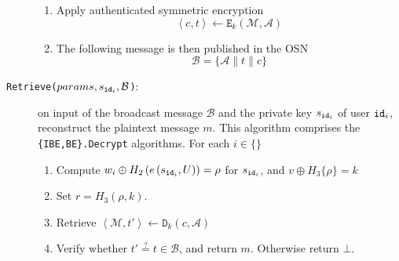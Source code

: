 \begin{algorithm}[H]
\begin{description}
\begin{enumerate}
        \item Apply authenticated symmetric encryption
        \begin{equation*}
            \left< c, t \right> \leftarrow \mathtt{E}_k(\mathcal{M},\mathcal{A})
        \end{equation*}
        \item The following message is then published in the OSN
        \begin{equation*}
            \mathcal{B} = \{ \mathcal{A} \parallel t \parallel c \}
        \end{equation*}
    \end{enumerate}
    \item[\texttt{Retrieve($params, s_{\mathtt{id}_{i}}, \mathcal{B}$)}:] on input of the broadcast message $\mathcal{B}$ and the private key $s_{\mathtt{id}_{i}}$ of user $\mathtt{id}_{i}$, reconstruct the plaintext message $m$. This algorithm comprises the \texttt{\{IBE,BE\}.Decrypt} algorithms. For each $i \in \{  \}$ \\

    \begin{enumerate}
        \item Compute $w_i \oplus H_2 \left( e \left( s_{\mathtt{id}_{i}}, U \right) \right) = \rho$ for $s_{\mathtt{id}_{i}}$, and $v \oplus H_3 \{ \rho \} = k$ 
        \item Set $r = H_3 \left( \rho, k \right)$. %
        \item Retrieve $\left< \mathcal{M}, t' \right> \leftarrow \mathtt{D}_k(c, \mathcal{A})$
        \item Verify whether $t' \stackrel{?}{=} t \in \mathcal{B} $, and return $m$. Otherwise return $\bot$. 
    \end{enumerate}
\end{description}
\end{algorithm}
\newpage

\makeatletter
\setlength{\headsep}{19.8738pt}
\makeatother

